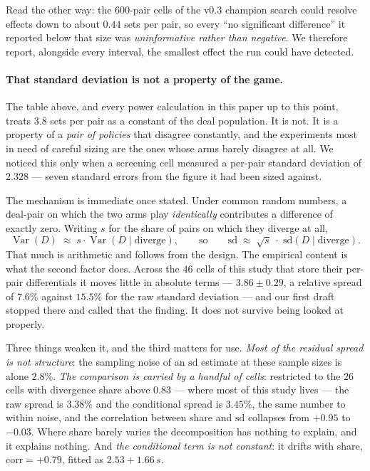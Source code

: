 \documentclass[11pt,a4paper]{article}
\begin{document}
Read the other way: the 600-pair cells of the v0.3 champion search could resolve
effects down to about $0.44$ sets per pair, so every ``no significant
difference'' it reported below that size was \emph{uninformative rather than
negative}. We therefore report, alongside every interval, the smallest effect
the run could have detected.

\paragraph{That standard deviation is not a property of the game.} The table
above, and every power calculation in this paper up to this point, treats
$3.8$ sets per pair as a constant of the deal population. It is not. It is a
property of a \emph{pair of policies} that disagree constantly, and the
experiments most in need of careful sizing are the ones whose arms barely
disagree at all. We noticed this only when a screening cell measured a per-pair
standard deviation of $2.328$ --- seven standard errors from the figure it had
been sized against.

The mechanism is immediate once stated. Under common random numbers, a deal-pair
on which the two arms play \emph{identically} contributes a difference of
exactly zero. Writing $s$ for the share of pairs on which they diverge at all,
\[
  \operatorname{Var}(D) \;\approx\; s \cdot \operatorname{Var}(D \mid \text{diverge}),
  \qquad\text{so}\qquad
  \mathrm{sd} \;\approx\; \sqrt{s}\;\cdot\;\mathrm{sd}(D \mid \text{diverge}).
\]
That much is arithmetic and follows from the design. The empirical content is
what the second factor does. Across the $46$ cells of this study that store
their per-pair differentials it moves little in absolute terms --- $3.86 \pm
0.29$, a relative spread of $7.6\%$ against $15.5\%$ for the raw standard
deviation --- and our first draft stopped there and called that the finding. It
does not survive being looked at properly.

Three things weaken it, and the third matters for use. \emph{Most of the
residual spread is not structure}: the sampling noise of an $\mathrm{sd}$
estimate at these sample sizes is alone $2.8\%$. \emph{The comparison is carried
by a handful of cells}: restricted to the $26$ cells with divergence share above
$0.83$ --- where most of this study lives --- the raw spread is $3.38\%$ and the
conditional spread is $3.45\%$, the same number to within noise, and the
correlation between share and $\mathrm{sd}$ collapses from $+0.95$ to $-0.03$.
Where share barely varies the decomposition has nothing to explain, and it
explains nothing. And \emph{the conditional term is not constant}: it drifts
with share, $\mathrm{corr} = +0.79$, fitted as $2.53 + 1.66\,s$.
\end{document}
